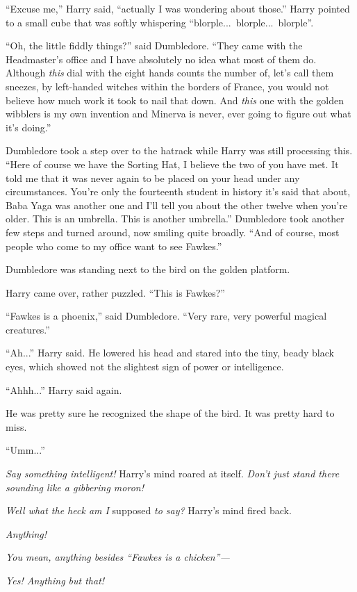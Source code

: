 “Excuse me,” Harry said, “actually I was wondering about those.” Harry pointed to a small cube that was softly whispering “blorple...\ blorple...\ blorple”.

“Oh, the little fiddly things?” said Dumbledore. “They came with the Headmaster’s office and I have absolutely no idea what most of them do. Although \emph{this} dial with the eight hands counts the number of, let’s call them sneezes, by left-handed witches within the borders of France, you would not believe how much work it took to nail that down. And \emph{this} one with the golden wibblers is my own invention and Minerva is never, ever going to figure out what it’s doing.”

Dumbledore took a step over to the hatrack while Harry was still processing this. “Here of course we have the Sorting Hat, I believe the two of you have met. It told me that it was never again to be placed on your head under any circumstances. You’re only the fourteenth student in history it’s said that about, Baba Yaga was another one and I’ll tell you about the other twelve when you’re older. This is an umbrella. This is another umbrella.” Dumbledore took another few steps and turned around, now smiling quite broadly. “And of course, most people who come to my office want to see Fawkes.”

Dumbledore was standing next to the bird on the golden platform.

Harry came over, rather puzzled. “This is Fawkes?”

“Fawkes is a phoenix,” said Dumbledore. “Very rare, very powerful magical creatures.”

“Ah...” Harry said. He lowered his head and stared into the tiny, beady black eyes, which showed not the slightest sign of power or intelligence.

“Ahhh...” Harry said again.

He was pretty sure he recognized the shape of the bird. It was pretty hard to miss.

“Umm...”

\emph{Say something intelligent!} Harry’s mind roared at itself. \emph{Don’t just stand there sounding like a gibbering moron!}

\emph{Well what the heck am I} supposed \emph{to say?} Harry’s mind fired back.

\emph{Anything!}

\emph{You mean, anything besides “Fawkes is a chicken”—}

\emph{Yes! Anything but that!}

